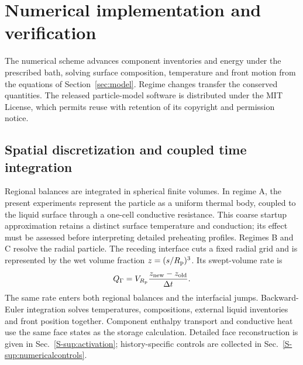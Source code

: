 \section{Numerical implementation and verification}
\label{sec:events}\label{sec:numerics}\label{sec:events:exact}
\label{sec:numerics:fv}\label{sec:numerics:reject}\label{sec:numerics:acceptance}
The numerical scheme advances component inventories and energy under the
prescribed bath, solving surface composition, temperature and front motion
from the equations of Section~\ref{sec:model}. Regime changes transfer the
conserved quantities.
The released particle-model software is distributed under the MIT License,
which permits reuse with retention of its copyright and permission notice.

\subsection{Spatial discretization and coupled time integration}
Regional balances are integrated in spherical finite volumes. In regime A,
the present experiments represent the particle as a uniform thermal body,
coupled to the liquid surface through a one-cell conductive resistance.
This coarse startup approximation retains a distinct surface temperature
and conduction; its effect must be assessed before interpreting detailed
preheating profiles. Regimes B and C resolve the radial particle.
The receding interface cuts a fixed radial grid and is represented by the
wet volume fraction $z=(s/R_{\mathrm{p}})^3$. Its swept-volume rate is
\begin{equation}
Q_{\Gamma}=V_{R_{\mathrm{p}}}\frac{z_{\mathrm{new}}-z_{\mathrm{old}}}{\Delta t}.
\label{eq:sweptvolume}
\end{equation}
The same rate enters both regional balances and the interfacial jumps.
Backward-Euler integration solves temperatures, compositions, external
liquid inventories and front position together. Component enthalpy transport
and conductive heat use the same face states as the storage calculation.
Detailed face reconstruction is given in Sec.~\ref*{S-sup:activation};
history-specific controls are collected in Sec.~\ref*{S-sup:numericalcontrols}.

